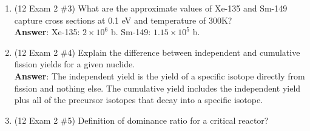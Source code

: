 \documentclass{school-22.211-notes}
\begin{document}
\begin{enumerate}
\item (12 Exam 2 \#3) What are the approximate values of Xe-135 and Sm-149 capture cross sections at 0.1 eV and temperature of 300K?  \\
\textbf{Answer}: Xe-135: $2\times 10^6$ b. Sm-149: $1.15 \times 10^5$ b. 

\item (12 Exam 2 \#4) Explain the difference between independent and cumulative fission yields for a given nuclide. \\
\textbf{Answer}: The independent yield is the yield of a specific isotope directly from fission and nothing else. The cumulative yield includes the independent yield plus all of the precursor isotopes that decay into a specific isotope. 

\item (12 Exam 2 \#5) Definition of dominance ratio for a critical reactor? 
\end{enumerate}
\end{document}
